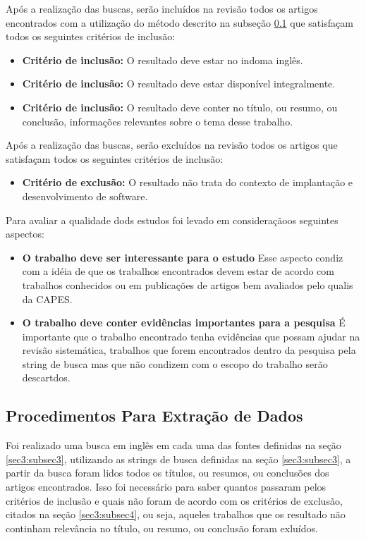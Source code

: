 \documentclass[12pt]{article}
\begin{document}
Após a realização das buscas, serão incluídos na revisão todos os artigos encontrados com a utilização do método descrito na subseção \ref{sec3:subsec5} que satisfaçam todos os seguintes critérios de inclusão:

 \begin{itemize}
   \item  \textbf{Critério de inclusão:} O resultado deve estar no indoma inglês.
   \item  \textbf{Critério de inclusão:} O resultado deve estar disponível integralmente.
   \item  \textbf{Critério de inclusão:} O resultado deve conter no título, ou resumo, ou conclusão,  informações relevantes sobre o tema desse trabalho.
 \end{itemize}

 Após a realização das buscas, serão excluídos na revisão todos os artigos que satisfaçam todos os seguintes critérios de inclusão:

 \begin{itemize}
   \item  \textbf{Critério de exclusão:} O resultado não trata do contexto de implantação e desenvolvimento de software.
 \end{itemize}

Para avaliar a qualidade dods estudos foi levado em consideraçãoos seguintes aspectos:

 \begin{itemize}
   \item  \textbf{O trabalho deve ser interessante para o estudo} Esse aspecto condiz com a idéia de que os trabalhos encontrados devem estar de acordo com trabalhos conhecidos ou em publicações de artigos bem avaliados pelo qualis da CAPES.
   \item  \textbf{O trabalho deve conter evidências importantes para a pesquisa} É importante que o trabalho encontrado tenha evidências que possam ajudar na revisão sistemática, trabalhos que forem encontrados dentro da pesquisa pela string de busca mas que não condizem com o escopo do trabalho serão descartdos.
 \end{itemize}

\subsection{Procedimentos Para Extração de Dados} \label{sec3:subsec5}

Foi realizado uma busca em inglês em cada uma das fontes definidas na seção \ref{sec3:subsec3}, utilizando as strings de busca definidas na seção \ref{sec3:subsec3}, a partir da busca foram lidos todos os títulos, ou resumos, ou conclusões dos artigos encontrados. Isso foi necessário para saber quantos passaram pelos critérios de inclusão e quais não foram de acordo com os critérios de exclusão, citados na seção \ref{sec3:subsec4}, ou seja, aqueles trabalhos que os resultado não continham relevância no título, ou resumo, ou conclusão foram exluídos.
\end{document}
